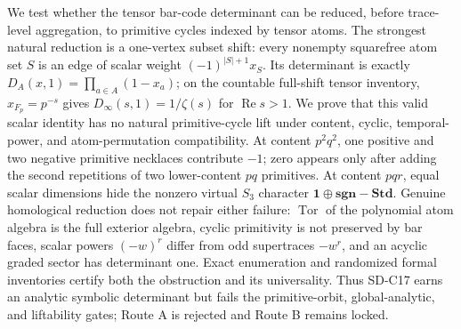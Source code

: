 We test whether the tensor bar-code determinant can be reduced, before
trace-level aggregation, to primitive cycles indexed by tensor atoms.  The
strongest natural reduction is a one-vertex subset shift: every nonempty
squarefree atom set $S$ is an edge of scalar weight
$(-1)^{|S|+1}x_S$.  Its determinant is exactly
$D_A(x,1)=\prod_{a\in A}(1-x_a)$; on the countable full-shift tensor
inventory, $x_{F_p}=p^{-s}$ gives $D_\infty(s,1)=1/\zeta(s)$ for
$\operatorname{Re}s>1$.  We prove that this valid scalar identity has no
natural primitive-cycle lift under content, cyclic, temporal-power, and
atom-permutation compatibility.  At content $p^2q^2$, one positive and two
negative primitive necklaces contribute $-1$; zero appears only after adding
the second repetitions of two lower-content $pq$ primitives.  At content
$pqr$, equal scalar dimensions hide the nonzero virtual $S_3$ character
$\mathbf1\oplus\mathbf{sgn}-\mathbf{Std}$.  Genuine homological reduction
does not repair either failure: $\operatorname{Tor}$ of the polynomial atom
algebra is the full exterior algebra, cyclic primitivity is not preserved by
bar faces, scalar powers $(-w)^r$ differ from odd supertraces $-w^r$, and an
acyclic graded sector has determinant one.  Exact enumeration and randomized
formal inventories certify both the obstruction and its universality.  Thus
SD-C17 earns an analytic symbolic determinant but fails the primitive-orbit,
global-analytic, and liftability gates; Route A is rejected and Route B
remains locked.
